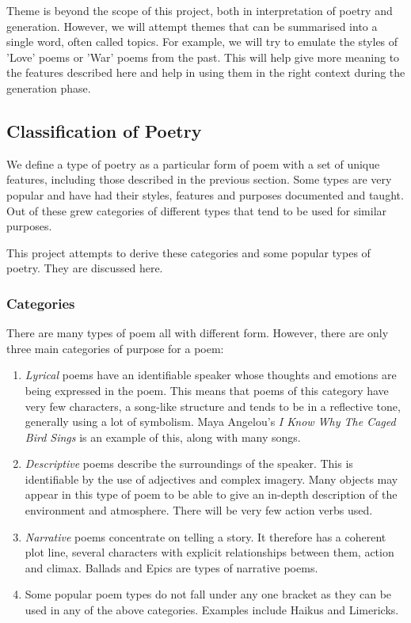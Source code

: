 Theme is beyond the scope of this project, both in interpretation of poetry and generation. However, we will attempt themes that can be summarised into a single word, often called topics. For example, we will try to emulate the styles of 'Love' poems or 'War' poems from the past. This will help give more meaning to the features described here and help in using them in the right context during the generation phase.

\subsection{Classification of Poetry}

We define a type of poetry as a particular form of poem with a set of unique features, including those described in the previous section. Some types are very popular and have had their styles, features and purposes documented and taught. Out of these grew categories of different types that tend to be used for similar purposes.

This project attempts to derive these categories and some popular types of poetry. They are discussed here.

\subsubsection{Categories}

There are many types of poem all with different form. However, there are only three main categories of purpose for a poem:

\begin{enumerate}
\item{\textit{Lyrical} poems have an identifiable speaker whose thoughts and emotions are being expressed in the poem. This means that poems of this category have very few characters, a song-like structure and tends to be in a reflective tone, generally using a lot of symbolism. Maya Angelou's \textit{I Know Why The Caged Bird Sings} is an example of this, along with many songs.}
\item{\textit{Descriptive} poems describe the surroundings of the speaker. This is identifiable by the use of adjectives and complex imagery. Many objects may appear in this type of poem to be able to give an in-depth description of the environment and atmosphere. There will be very few action verbs used.}
\item{\textit{Narrative} poems concentrate on telling a story. It therefore has a coherent plot line, several characters with explicit relationships between them, action and climax. Ballads and Epics are types of narrative poems.}
\item{Some popular poem types do not fall under any one bracket as they can be used in any of the above categories. Examples include Haikus and Limericks.}
\end{enumerate}

